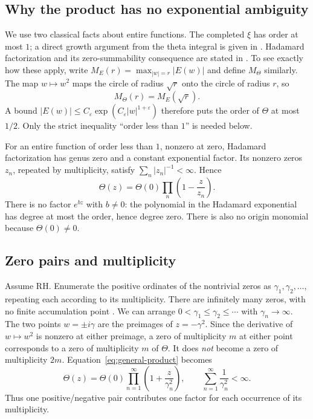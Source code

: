 \documentclass[11pt,a4paper]{article}
\numberwithin{equation}{section}
\theoremstyle{definition}
\theoremstyle{remark}
\begin{document}
\subsection{Why the product has no exponential ambiguity}

We use two classical facts about entire functions. The completed
$\xi$ has order at most $1$; a direct growth argument from the theta
integral is given in \cite{garrett}. Hadamard factorization and its
zero-summability consequence are stated in
\cite[Theorems~3.7 and 3.11]{mcmullen}.
To see exactly how these apply, write
$M_E(r)=\max_{|w|=r}|E(w)|$ and define $M_\Theta$ similarly.
The map $w\mapsto w^2$ maps the circle of radius $\sqrt r$ onto the
circle of radius $r$, so
\begin{equation}\label{eq:order-halving}
M_\Theta(r)=M_E(\sqrt r).
\end{equation}
A bound $|E(w)|\leq C_\varepsilon
\exp(C_\varepsilon |w|^{1+\varepsilon})$ therefore puts the order
of $\Theta$ at most $1/2$. Only the strict inequality ``order less
than $1$'' is needed below.

For an entire function of order less than $1$, nonzero at zero,
Hadamard factorization has genus zero and a constant exponential factor.
Its nonzero zeros $z_n$, repeated by multiplicity, satisfy
$\sum_n|z_n|^{-1}<\infty$. Hence
\begin{equation}\label{eq:general-product}
\Theta(z)=\Theta(0)\prod_n\left(1-\frac z{z_n}\right).
\end{equation}
There is no factor $e^{bz}$ with $b\ne0$: the polynomial in the
Hadamard exponential has degree at most the order, hence degree zero.
There is also no origin monomial because $\Theta(0)\ne0$.

\subsection{Zero pairs and multiplicity}

Assume RH. Enumerate the positive ordinates of the nontrivial zeros
as $\gamma_1,\gamma_2,\ldots$, repeating each according to its
multiplicity. There are infinitely many zeros, with no finite
accumulation point \cite{dlmf-zeros}. We can arrange
$0<\gamma_1\leq\gamma_2\leq\cdots$ with $\gamma_n\to\infty$.
The two points $w=\pm i\gamma$ are the preimages of
$z=-\gamma^2$. Since the derivative of $w\mapsto w^2$ is nonzero
at either preimage, a zero of multiplicity $m$ at either point
corresponds to a zero of multiplicity $m$ of $\Theta$.
It does \emph{not} become a zero of multiplicity $2m$.
Equation~\eqref{eq:general-product} becomes
\begin{equation}\label{eq:rh-product}
\Theta(z)=\Theta(0)\prod_{n=1}^{\infty}
\left(1+\frac z{\gamma_n^2}\right),\qquad
\sum_{n=1}^{\infty}\frac1{\gamma_n^2}<\infty.
\end{equation}
Thus one positive/negative pair contributes one factor for each
occurrence of its multiplicity.
\end{document}
